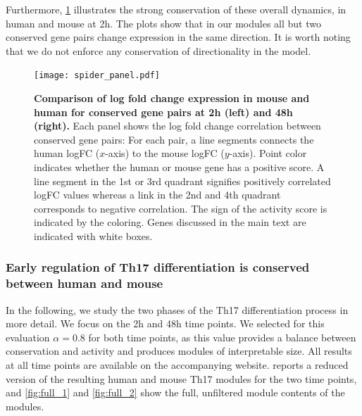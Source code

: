 Furthermore, \cref{fig:spider-xheinz_modules} illustrates the strong conservation of these overall dynamics, in human and mouse at \unit{2}{h}.
The plots show that in our modules all but two conserved gene pairs change expression in the same direction.
It is worth noting that we do not enforce any conservation of directionality in the \xheinz{} model.

\begin{landscape}
\begin{figure}[h]
  \centering
  \texttt{[image: spider\_panel.pdf]}
  \caption[Comparison of log fold change expression in mouse and human for conserved gene pairs at \unit{2}{h} and \unit{48}{h}]{\textbf{Comparison of log fold change expression in mouse and human for conserved gene pairs at \unit{2}{h} (left) and \unit{48}{h} (right).}
 Each panel shows the log fold change correlation between conserved gene pairs:
 For each pair, a line segments connects the human logFC ($x$-axis) to the mouse
 logFC ($y$-axis). Point color indicates whether the human or mouse gene has a
 positive score.
      A line segment in the 1st or 3rd quadrant
   signifies positively correlated logFC values whereas a link in the
   2nd and 4th quadrant corresponds to negative correlation. The sign
   of the activity score is indicated by the coloring. Genes discussed
   in the main text are indicated with white boxes.}
  \label{fig:spider-xheinz_modules}
\end{figure}
\end{landscape}


\subsubsection{Early regulation of Th17 differentiation is conserved between human and mouse}
\label{sub:main_regulation_of_th17_differentiation_is_conserved_between_human_and_mouse}

In the following, we study the two phases of the Th17 differentiation process in more detail.
We focus on the \unit{2}{h} and \unit{48}{h} time points.
We selected for this evaluation $\alpha=0.8$ for both time points, as this value provides a balance between conservation and activity and produces modules of interpretable size.
All results at all time points are available on the accompanying website.
 reports a reduced version of the resulting human and mouse Th17 modules for the two time points, and \cref{fig:full_1} and \cref{fig:full_2} show the full, unfiltered module contents of the modules.

